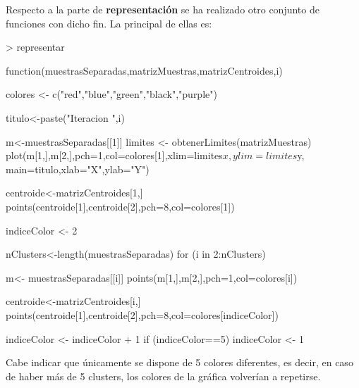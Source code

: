 \documentclass [a4paper] {article}
\begin{document}
\bigskip
Respecto a la parte de \textbf{representación} se ha realizado otro conjunto de funciones con dicho fin. La
principal de ellas es:
\begin{Schunk}
\begin{Sinput}
> representar
\end{Sinput}
\begin{Soutput}
function(muestrasSeparadas,matrizMuestras,matrizCentroides,i){
    colores <- c("red","blue","green","black","purple")

    titulo<-paste("Iteracion ",i)

    m<-muestrasSeparadas[[1]]
    limites <- obtenerLimites(matrizMuestras)
    plot(m[1,],m[2,],pch=1,col=colores[1],xlim=limites$x,ylim=limites$y,
        main=titulo,xlab="X",ylab="Y")

    centroide<-matrizCentroides[1,]
    points(centroide[1],centroide[2],pch=8,col=colores[1])

    indiceColor <- 2

    nClusters<-length(muestrasSeparadas)
    for (i in 2:nClusters) {
        m<- muestrasSeparadas[[i]]
        points(m[1,],m[2,],pch=1,col=colores[i])

        centroide<-matrizCentroides[i,]
        points(centroide[1],centroide[2],pch=8,col=colores[indiceColor])

        indiceColor <- indiceColor + 1
        if (indiceColor==5) {
            indiceColor <- 1
        }
    }
}
\end{Soutput}
\end{Schunk}

\bigskip
Cabe indicar que únicamente se dispone de 5 colores diferentes, es decir, en caso de haber más de 5 clusters,
los colores de la gráfica volverían a repetirse.
\end{document}
